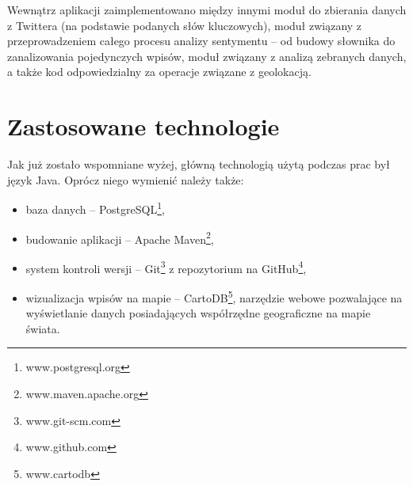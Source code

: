 Wewnątrz aplikacji zaimplementowano między innymi moduł do zbierania danych z
Twittera (na podstawie podanych słów kluczowych), moduł związany z
przeprowadzeniem całego procesu analizy sentymentu -- od budowy słownika do
zanalizowania pojedynczych wpisów, moduł związany z analizą zebranych danych,
a także kod odpowiedzialny za operacje związane z geolokacją.

\section{Zastosowane technologie}
\label{section:zastosowanetechnologie}
Jak już zostało wspomniane wyżej, główną technologią użytą podczas prac był
język Java. Oprócz niego wymienić należy także:
\begin{itemize}
  \item baza danych -- PostgreSQL\footnote{www.postgresql.org},
  \item budowanie aplikacji -- Apache Maven\footnote{www.maven.apache.org},
  \item system kontroli wersji -- Git\footnote{www.git-scm.com} z 
  repozytorium na GitHub\footnote{www.github.com},
  \item wizualizacja wpisów na mapie -- CartoDB\footnote{www.cartodb},
  narzędzie webowe pozwalające na wyświetlanie danych posiadających współrzędne
  geograficzne na mapie świata.
\end{itemize}

